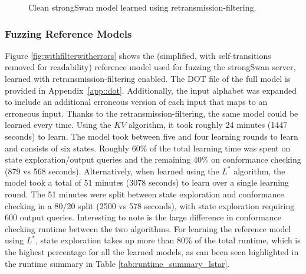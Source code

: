 \begin{figure}[ht]
	\vspace*{\fill}
	\noindent
	\hspace*{-5.5\oddsidemargin}%
	\caption{Clean strongSwan model learned using retransmission-filtering.}
	\label{fig:reference}
	\vspace*{\fill}
\end{figure}

\subsubsection*{Fuzzing Reference Models}
Figure \ref{fig:withfilterwitherrors} shows the (simplified, with self-transitions removed for readability) reference model used for fuzzing the strongSwan server, learned with retransmission-filtering enabled. The DOT file of the full model is provided in Appendix~\ref{app::dot}. Additionally, the input alphabet was expanded to include an additional erroneous version of each input that maps to an erroneous input. Thanks to the retransmission-filtering, the same model could be learned every time. Using the $KV$ algorithm, it took roughly 24 minutes (1447 seconds) to learn. The model took between five and four learning rounds to learn and consists of six states. Roughly 60\% of the total learning time was spent on state exploration/output queries and the remaining 40\% on conformance checking (879 vs 568 seconds). Alternatively, when learned using the $L^*$ algorithm, the model took a total of 51 minutes (3078 seconds) to learn over a single learning round. The 51 minutes were split between state exploration and conformance checking in a 80/20 split (2500 vs 578 seconds), with state exploration requiring 600 output queries. Interesting to note is the large difference in conformance checking runtime between the two algorithms. For learning the reference model using $L^*$, state exploration takes up more than 80\% of the total runtime, which is the highest percentage for all the learned models, as can been seen highlighted in the runtime summary in Table \ref{tab:runtime_summary_lstar}.

